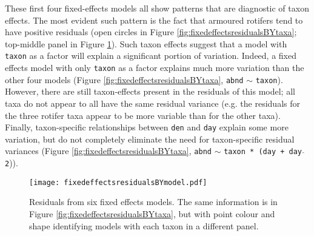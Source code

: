 \documentclass[12pt]{ecologyFORAPPENDIX}
\newcommand{\processfloatnow}{
	\begingroup
	\let\cleardoublepage\relax
	\let\clearpage\relax
	\processdelayedfloats
	\endgroup
}
\begin{document}
These first four fixed-effects models all show patterns that are diagnostic of taxon effects.  The most evident such pattern is the fact that armoured rotifers tend to have positive residuals (open circles in Figure \ref{fig:fixedeffectsresidualsBYtaxa}; top-middle panel in Figure \ref{fig:fixedeffectsresidualsBYmodel}).  Such taxon effects suggest that a model with \texttt{taxon} as a factor will explain a significant portion of variation.  Indeed, a fixed effects model with only \texttt{taxon} as a factor explains much more variation than the other four models (Figure \ref{fig:fixedeffectsresidualsBYtaxa}, \texttt{abnd} $\sim$ \texttt{taxon}).  However, there are still taxon-effects present in the residuals of this model; all taxa do not appear to all have the same residual variance (e.g. the residuals for the three rotifer taxa appear to be more variable than for the other taxa).  Finally, taxon-specific relationships between \texttt{den} and \texttt{day} explain some more variation, but do not completely eliminate the need for taxon-specific residual variances (Figure \ref{fig:fixedeffectsresidualsBYtaxa}, \texttt{abnd} $\sim$ \texttt{taxon * (day + day} $\hat{}$ \texttt{2})).

\begin{figure}
\texttt{[image: fixedeffectsresidualsBYmodel.pdf]}
\caption{Residuals from six fixed effects models.  The same information is in Figure \ref{fig:fixedeffectsresidualsBYtaxa}, but with point colour and shape identifying models with each taxon in a different panel.}
\label{fig:fixedeffectsresidualsBYmodel}
\end{figure}
\processfloatnow
\end{document}
